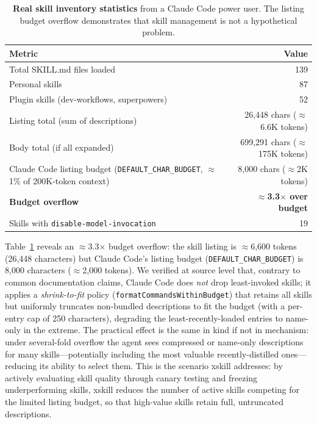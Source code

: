\documentclass{article}
\begin{document}
\begin{table}[h]
\centering
\caption{\textbf{Real skill inventory statistics} from a Claude Code power user. The listing budget overflow demonstrates that skill management is not a hypothetical problem.}
\label{tab:inventory}
\small
\begin{tabular}{@{}lr@{}}
\toprule
\textbf{Metric} & \textbf{Value} \\
\midrule
Total SKILL.md files loaded & 139 \\
\quad Personal skills & 87 \\
\quad Plugin skills (dev-workflows, superpowers) & 52 \\
Listing total (sum of descriptions) & 26,448 chars ($\approx$6.6K tokens) \\
Body total (if all expanded) & 699,291 chars ($\approx$175K tokens) \\
Claude Code listing budget (\texttt{DEFAULT\_CHAR\_BUDGET}, $\approx$1\% of 200K-token context) & 8,000 chars ($\approx$2K tokens) \\
\textbf{Budget overflow} & \textbf{$\approx$3.3$\times$ over budget} \\
Skills with \texttt{disable-model-invocation} & 19 \\
\bottomrule
\end{tabular}
\end{table}

Table~\ref{tab:inventory} reveals an $\approx$3.3$\times$ budget overflow: the skill listing is $\approx$6{,}600 tokens (26{,}448 characters) but Claude Code's listing budget (\texttt{DEFAULT\_CHAR\_BUDGET}) is 8{,}000 characters ($\approx$2{,}000 tokens). We verified at source level that, contrary to common documentation claims, Claude Code does \emph{not} drop least-invoked skills; it applies a \emph{shrink-to-fit} policy (\texttt{formatCommandsWithinBudget}) that retains all skills but uniformly truncates non-bundled descriptions to fit the budget (with a per-entry cap of 250 characters), degrading the least-recently-loaded entries to name-only in the extreme. The practical effect is the same in kind if not in mechanism: under several-fold overflow the agent sees compressed or name-only descriptions for many skills---potentially including the most valuable recently-distilled ones---reducing its ability to select them. This is the scenario xskill addresses: by actively evaluating skill quality through canary testing and freezing underperforming skills, xskill reduces the number of active skills competing for the limited listing budget, so that high-value skills retain full, untruncated descriptions.
\end{document}
